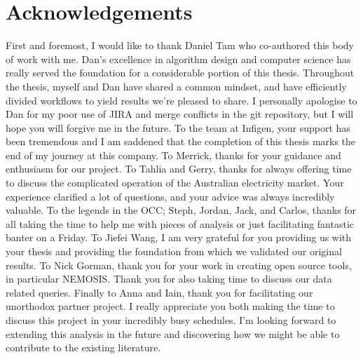 \documentclass[11pt,fleqn]{book} %
\makeatletter
\newcommand{\tocfill}{\cleaders\hbox{$\m@th \mkern\@dotsep mu . \mkern\@dotsep mu$}\hfill}
\newcommand{\abbrlabel}[1]{\makebox[3cm][l]{\textbf{#1}\ \tocfill}}
\newenvironment{abbreviations}{\begin{list}{}{\renewcommand{\makelabel}{\abbrlabel}%
                                              \setlength{\itemsep}{0pt}}}{\end{list}}
\makeatother
\begin{document}
\chapter*{Acknowledgements}
First and foremost, I would like to thank Daniel Tam who co-authored this body of work with me. Dan's excellence in algorithm design and computer science has really served the foundation for a considerable portion of this thesis. Throughout the thesis, myself and Dan have shared a common mindset, and have efficiently divided workflows to yield results we're pleased to share. I personally apologise to Dan for my poor use of JIRA and merge conflicts in the git repository, but I will hope you will forgive me in the future. 
\newline
\newline
To the team at Infigen, your support has been tremendous and I am saddened that the completion of this thesis marks the end of my journey at this company. To Merrick, thanks for your guidance and enthusiasm for our project. To Tahlia and Gerry, thanks for always offering time to discuss the complicated operation of the Australian electricity market. Your experience clarified a lot of questions, and your advice was always incredibly valuable. To the legends in the OCC; Steph, Jordan, Jack, and Carlos, thanks for all taking the time to help me with pieces of analysis or just facilitating fantastic banter on a Friday.
\newline
\newline
To Jiefei Wang, I am very grateful for you providing us with your thesis and providing the foundation from which we validated our original results. To Nick Gorman, thank you for your work in creating open source tools, in particular NEMOSIS. Thank you for also taking time to discuss our data related queries. 
\newline
\newline
Finally to Anna and Iain, thank you for facilitating our unorthodox partner project. I really appreciate you both making the time to discuss this project in your incredibly busy schedules. I'm looking forward to extending this analysis in the future and discovering how we might be able to contribute to the existing literature. 
\end{document}
